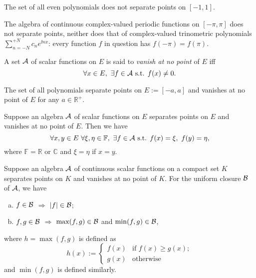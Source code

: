 \begin{exm}
  The set of all even polynomials 
  does not separate points on $[-1,1]$. 
\end{exm}

\begin{exm}
  \label{exm:complexTrigPolysNotSeparable}
  The algebra of continuous complex-valued
  periodic functions on $[-\pi, \pi]$
  does not separate points, 
  neither does that of complex-valued
  trinometric polynomials
  $\sum_{n=-N}^{+N} c_n e^{\ii nx}$:
  every function $f$ in question has
  $f(-\pi) = f(\pi)$. 
\end{exm}

\begin{defn}
  \label{def:vanishAtNoPoints}
  A set ${\cal A}$ of scalar functions on $E$
  is said to \emph{vanish at no point} of $E$ iff
  \begin{displaymath}
    \forall x\in E,\
    \exists f\in{\cal A} \text{ s.t. }
    f(x)\ne 0. 
  \end{displaymath}
\end{defn}

\begin{exm}
  The set of all polynomials %
  separate points on $E:=[-a,a]$
  and vanishes at no point of $E$ for any $a\in\mathbb{R}^+$.  
\end{exm}

\begin{lem}
  \label{lem:twoValsOfFuncAlgebra}
  Suppose an algebra ${\cal A}$ of scalar functions on $E$
  separates points on $E$ and vanishes at no point of $E$.
  Then we have
  \begin{displaymath}
    \forall x, y\in E\ %
    \forall \xi, \eta \in \mathbb{F},\
    \exists f\in {\cal A} \text{ s.t. }
    f(x)=\xi,\ f(y)=\eta, 
  \end{displaymath}
  where $\mathbb{F}=\mathbb{R}$ or $\mathbb{C}$
  and $\xi=\eta$ if $x=y$. 
\end{lem}

\begin{lem}
  \label{lem:absMaxMinInFuncClosure}
  Suppose an algebra ${\cal A}$ of continuous scalar functions
  on a compact set $K$
  separates points on $K$ and vanishes at no point of $K$.
  For the uniform closure ${\cal B}$ of ${\cal A}$, 
  we have
  \begin{enumerate}[(a)]\itemsep0em
  \item $f\in{\cal B}$ $\Rightarrow$ $|f|\in {\cal B}$;
  \item $f,g\in{\cal B}$ $\Rightarrow$
    $\max(f,g)\in {\cal B}$ and $\min(f,g)\in {\cal B}$, 
  \end{enumerate}
  where $h=\max(f,g)$ is defined as
  \begin{equation}
    \label{eq:maxFG}
    h(x):=
    \begin{cases}
      f(x) & \text{if } f(x)\ge g(x);
      \\
      g(x) & \text{otherwise }
    \end{cases}
  \end{equation}
  and $\min(f,g)$ is defined similarly.
\end{lem}

